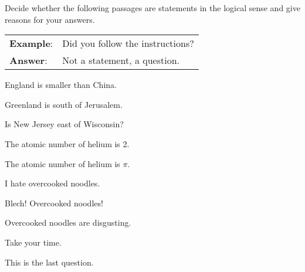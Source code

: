\noindent\problempart Decide whether the following passages are statements in the logical sense and give reasons for your answers.

\begin{longtabu}{p{.1\linewidth}p{.9\linewidth}}
\textbf{Example}: & Did you follow the instructions? \\
\textbf{Answer}: & Not a statement, a question. \\
\end{longtabu}


\begin{exercises}
\item England is smaller than China. 
\item Greenland is south of Jerusalem. 
\item Is New Jersey east of Wisconsin? 
\item The atomic number of helium is 2. 
\item The atomic number of helium is $\pi$. 
\item I hate overcooked noodles. 
\item Blech! Overcooked noodles! 
\item Overcooked noodles are disgusting.
\item Take your time. 
\item This is the last question. 
\end{exercises}


